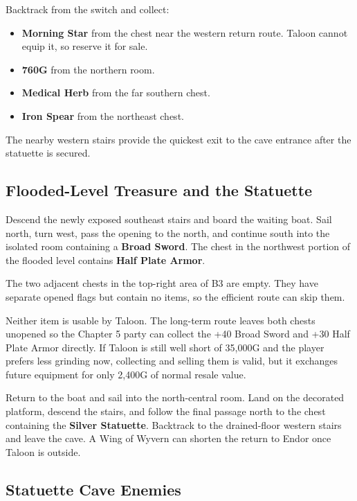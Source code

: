 \documentclass[
  american,
  10pt,
  letterpaper,
  oneside,
  open=any]{scrreprt}
\providecommand{\tightlist}{%
  \setlength{\itemsep}{0pt}\setlength{\parskip}{0pt}}
\begin{document}
Backtrack from the switch and collect:

\begin{itemize}
\tightlist
\item
  \textbf{Morning Star} from the chest near the western return route.
  Taloon cannot equip it, so reserve it for sale.
\item
  \textbf{760G} from the northern room.
\item
  \textbf{Medical Herb} from the far southern chest.
\item
  \textbf{Iron Spear} from the northeast chest.
\end{itemize}

The nearby western stairs provide the quickest exit to the cave entrance
after the statuette is secured.

\subsection{Flooded-Level Treasure and the
Statuette}\label{flooded-level-treasure-and-the-statuette}

Descend the newly exposed southeast stairs and board the waiting boat.
Sail north, turn west, pass the opening to the north, and continue south
into the isolated room containing a \textbf{Broad Sword}. The chest in
the northwest portion of the flooded level contains \textbf{Half Plate
Armor}.

The two adjacent chests in the top-right area of B3 are empty. They have
separate opened flags but contain no items, so the efficient route can
skip them.

Neither item is usable by Taloon. The long-term route leaves both chests
unopened so the Chapter 5 party can collect the +40 Broad Sword and +30
Half Plate Armor directly. If Taloon is still well short of 35,000G and
the player prefers less grinding now, collecting and selling them is
valid, but it exchanges future equipment for only 2,400G of normal
resale value.

Return to the boat and sail into the north-central room. Land on the
decorated platform, descend the stairs, and follow the final passage
north to the chest containing the \textbf{Silver Statuette}. Backtrack
to the drained-floor western stairs and leave the cave. A Wing of Wyvern
can shorten the return to Endor once Taloon is outside.

\subsection{Statuette Cave Enemies}\label{statuette-cave-enemies}
\end{document}
